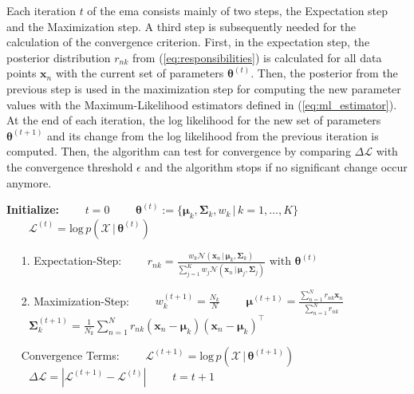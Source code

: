 \documentclass[../../../main.tex]{subfiles}
\begin{document}
Each iteration $t$ of the \acrshort{ema} consists mainly of two steps, the Expectation step and the Maximization step. A third step is subsequently needed for the calculation of the convergence criterion. First, in the expectation step, the posterior distribution $r_{nk}$ from (\ref{eq:responsibilities}) is calculated for all data points $\bm{x}_n$ with the current set of parameters $\bm{\theta}^{(t)}$. Then, the posterior from the previous step is used in the maximization step for computing the new parameter values with the Maximum-Likelihood estimators defined in (\ref{eq:ml_estimator}). At the end of each iteration, the log likelihood for the new set of parameters $\bm{\theta}^{(t+1)}$ and its change from the log likelihood from the previous iteration is computed. Then, the algorithm can test for convergence by comparing $\Delta \mathcal{L}$ with the convergence threshold $\epsilon$ and the algorithm stops if no significant change occur anymore.

\begin{algorithm}
    \caption[The \gls{ema} for \glspl{gmm}]{The \gls{ema} for \glspl{gmm}.}
    \label{alg:ema_gmm}
    \begin{algorithmic}[1]
        \STATEx \textbf{Initialize:}
        \STATE $\qquad t = 0$
        \STATE $\qquad \bm{\theta}^{(t)} := \{ \bm{\mu}_k, \bm{\Sigma}_k, w_k \, | \, k=1,\dots,K \}$
        \STATE $\qquad \mathcal{L}^{(t)} = \text{log} \, p(\mathcal{X} \, | \, \bm{\theta}^{(t)})$

            \STATEx $\quad$ 1. Expectation-Step:
            \STATE $\qquad r_{nk} = \frac{w_k \mathcal{N}(\bm{x}_n \, | \, \bm{\mu}_k, \bm{\Sigma}_k)}{\sum_{j=1}^K w_j \mathcal{N}(\bm{x}_n \, | \, \bm{\mu}_j, \bm{\Sigma}_j)} \text{ with } \bm{\theta}^{(t)}$

            \STATEx $\quad$ 2. Maximization-Step:
            \STATE $\qquad w_k^{(t+1)} = \frac{N_k}{N}$
            \STATE $\qquad \bm{\mu}^{(t+1)} = \frac{\sum_{n=1}^N r_{nk} \bm{x}_n}{\sum_{n=1}^N r_{nk}}$
            \STATE $\qquad \bm{\Sigma}_k^{(t+1)} = \frac{1}{N_k}\sum_{n=1}^N r_{nk}(\bm{x}_n-\bm{\mu}_k)(\bm{x}_n-\bm{\mu}_k)^\top$

            \STATEx $\quad$ Convergence Terms:
            \STATE $\qquad \mathcal{L}^{(t+1)} = \text{log} \, p(\mathcal{X} \, | \, \bm{\theta}^{(t+1)})$
            \STATE $\qquad \Delta \mathcal{L} = | \mathcal{L}^{(t+1)} - \mathcal{L}^{(t)} |$
            \STATE $\qquad t = t+1$

        \ENDWHILE
    \end{algorithmic}
 \end{algorithm}
\end{document}
